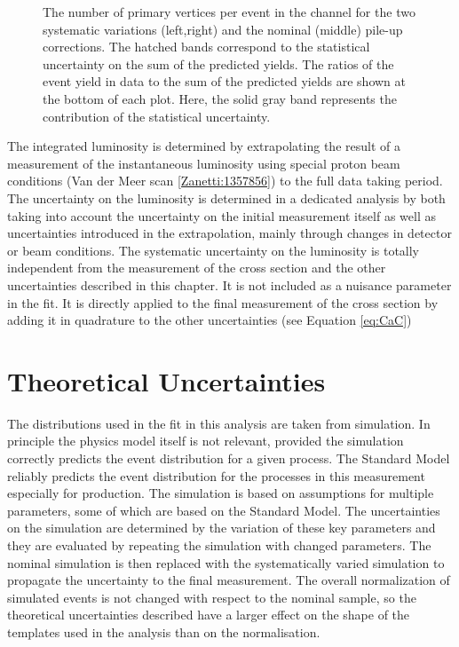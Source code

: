 \begin{figure}[htbp!]
\begin{center}
\caption{The number of primary vertices per event in the \emu channel for the two systematic variations (left,right) and the nominal (middle) pile-up corrections.
The hatched bands correspond to the statistical uncertainty on the sum of the predicted yields. 
        The ratios of the event yield in data to the sum of the predicted yields are
        shown at the bottom of each plot. Here, the solid gray band
        represents the contribution of the statistical uncertainty.
  \label{fig:control_var_PU}}
  \end{center}
\end{figure}


The integrated luminosity is determined by extrapolating the result of a measurement  of the instantaneous luminosity using special proton beam conditions (Van der Meer scan \ref{Zanetti:1357856}) to the full data taking period.
The uncertainty on the luminosity is determined in a dedicated analysis by both taking into account the uncertainty on the initial measurement itself as well as uncertainties
introduced in the extrapolation, mainly through changes in detector or beam conditions.
The systematic uncertainty on the luminosity is totally independent from the measurement of the \ttbar cross section and the other uncertainties described in this chapter.
It is not included as a nuisance parameter in the fit. It is directly applied to the final measurement of the \ttbar cross section by adding it in quadrature to the other uncertainties (see Equation \ref{eq:CaC})

\section{Theoretical Uncertainties}
\label{sec:theo_uncert}

The distributions used in the fit in this analysis are taken from simulation. In principle the physics model itself is not relevant, provided the simulation correctly predicts the event distribution for a given process.
The Standard Model reliably predicts the event distribution for the processes in this measurement especially for \ttbar production.
The simulation is based on assumptions for multiple parameters, some of which are based on the Standard Model. The uncertainties on the simulation are determined by the variation of these key parameters and they are
evaluated by repeating the simulation with changed parameters. The nominal simulation is then replaced with the systematically varied simulation to propagate the uncertainty to the final measurement.
The overall normalization of simulated \ttbar events is not changed with respect to the nominal sample, so the theoretical uncertainties described have a larger effect on the shape of the templates used
in the analysis than on the normalisation.

